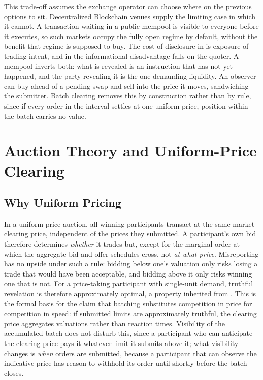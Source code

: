 This trade-off assumes the exchange operator can choose where on the previous options to
sit. Decentralized Blockchain venues supply the limiting case in which it cannot. A
transaction waiting in a public mempool is visible to everyone before it
executes, so such markets occupy the fully open regime by default,
without the benefit that regime is supposed to buy. The cost of
disclosure in \citet{madhavan1996transparency} is exposure of trading
intent, and in \citet{glosten1985bid} the informational disadvantage
falls on the quoter. A mempool inverts both: what is revealed is an
instruction that has not yet happened, and the party revealing it is the
one demanding liquidity. An observer can buy ahead of a pending swap and
sell into the price it moves, sandwiching the submitter. Batch clearing
removes this by construction rather than by rule, since if every order in
the interval settles at one uniform price, position within the batch
carries no value.


\section{Auction Theory and Uniform-Price Clearing}
\label{sec:auctiontheory}

\subsection{Why Uniform Pricing}

In a uniform-price auction, all winning participants transact at the same
market-clearing price, independent of the prices they submitted. A
participant's own bid therefore determines \emph{whether} it trades but,
except for the marginal order at which the aggregate bid and offer
schedules cross, not \emph{at what price}. Misreporting has no upside
under such a rule: bidding below one's valuation only risks losing a
trade that would have been acceptable, and bidding above it only risks
winning one that is not. For a price-taking participant with single-unit
demand, truthful revelation is therefore approximately optimal, a
property inherited from \citet{vickrey1961counterspeculation}. This is
the formal basis for the claim that batching substitutes competition in
price for competition in speed: if submitted limits are approximately
truthful, the clearing price aggregates valuations rather than reaction
times. Visibility of the accumulated batch does not disturb this, since
a participant who can anticipate the clearing price pays it whatever
limit it submits above it; what visibility changes is \emph{when} orders
are submitted, because a participant that can observe the indicative
price has reason to withhold its order until shortly before the batch
closes.

